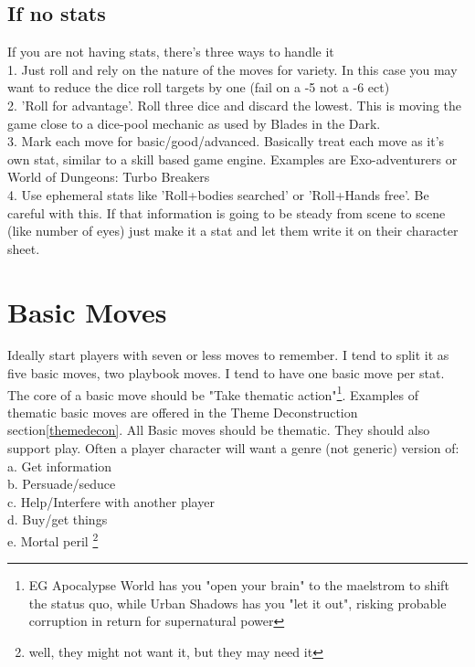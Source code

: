 \documentclass{tufte-handout}
\begin{document}
\subsection{If no stats}
If you are not having stats, there's three ways to  handle it\\
1. Just roll and rely on the nature of the moves for variety. In this case you may want to reduce the dice roll targets by one (fail on a -5 not a -6 ect)\\
2. 'Roll for advantage'. Roll three dice and discard the lowest. This is moving the game close to a dice-pool mechanic as used by Blades in the Dark.\\
3. Mark each move for basic/good/advanced. Basically treat each move as it's own stat, similar to a skill based game engine. Examples are Exo-adventurers or World of Dungeons: Turbo Breakers\\
4. Use ephemeral stats like 'Roll+bodies searched' or 'Roll+Hands free'. Be careful with this. If that information is going to be steady from scene to scene (like number of eyes) just make it a stat and let them write it on their character sheet.

\section{Basic Moves}
Ideally start players with seven or less moves to remember. I tend to split it as five basic moves, two playbook moves. I tend to have one basic move per stat. The core of a basic move should be "Take thematic action"\footnote{EG Apocalypse World has you "open your brain" to the maelstrom to shift the status quo, while Urban Shadows has you "let it out", risking probable corruption in return for supernatural power}. Examples of thematic basic moves are offered in the Theme Deconstruction section\ref{themedecon}.
All Basic moves should be thematic. They should also support play. Often a player character will want a genre (not generic) version of:\\
a. Get information\\
b. Persuade/seduce\\
c. Help/Interfere with another player\\
d. Buy/get things\\
e. Mortal peril \footnote{well, they might not want it, but they may need it}\\
\end{document}
